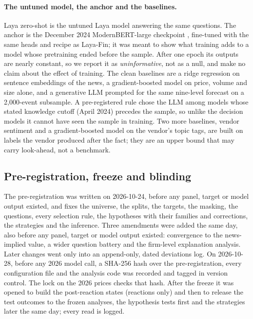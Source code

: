 \paragraph{The untuned model, the anchor and the baselines.} Laya zero-shot is the untuned Laya model answering
the same questions. The anchor is the December 2024 ModernBERT-large checkpoint \citep{warner2025}, fine-tuned
with the same heads and recipe as Laya-Fin; it was meant to show what training adds to a model whose
pretraining ended before the sample. After one epoch its outputs are nearly constant, so we report it as
\emph{uninformative}, not as a null, and make no claim about the effect of training. The clean baselines are a
ridge regression \citep{hoerl1970} on sentence embeddings of the news, a gradient-boosted model \citep{ke2017} on
price, volume and size alone, and a generative LLM prompted for the same nine-level forecast on a 2,000-event
subsample. A pre-registered rule chose the LLM among models whose stated knowledge cutoff (April 2024) precedes
the sample, so unlike the decision models it cannot have seen the sample in training. Two more baselines, vendor
sentiment and a gradient-boosted model on the vendor's topic tags, are built on labels the vendor produced after
the fact; they are an upper bound that may carry look-ahead, not a benchmark.

\subsection{Pre-registration, freeze and blinding}\label{sec:prereg}

The pre-registration was written on 2026-10-24, before any panel, target or model output existed, and fixes the
universe, the splits, the targets, the masking, the questions, every selection rule, the hypotheses with their
families and corrections, the strategies and the inference. Three amendments were added the same day, also before any
panel, target or model output existed: convergence to the news-implied value, a wider question battery and the
firm-level explanation analysis.
Later changes went only into an append-only, dated deviations log. On 2026-10-28, before any 2026 model call, a
SHA-256 hash over the pre-registration, every configuration file and the analysis code was recorded and tagged in
version control. The lock on the 2026 prices checks that hash. After the freeze it was opened to build the
post-reaction states (reactions only) and then to release the test outcomes to the frozen analyses, the hypothesis
tests first and the strategies later the same day; every read is logged.

